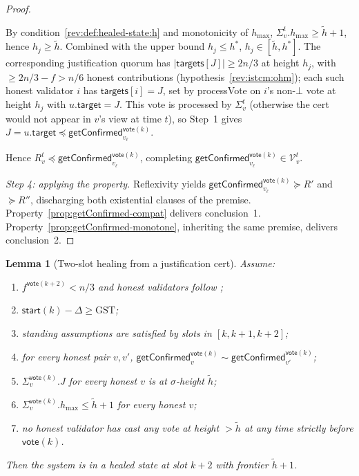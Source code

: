 \ifx\litemode\undefined\documentclass{article}\fi
\newcommand{\V}[0]{\ensuremath{\mathcal{V}}}
\newcommand{\target}{\mathsf{target}}
\newcommand{\targets}{\mathsf{targets}}
\newcommand{\hmax}{\ensuremath{h_{\max}}\xspace}
\newcommand{\processVote}{\textsf{processVote}\xspace}
\newcommand{\start}{\ensuremath{\mathsf{start}}}
\newcommand{\vote}{\ensuremath{\mathsf{vote}}}
\newcommand{\GST}{\ensuremath{\mathrm{GST}}\xspace}
\newcommand{\comm}[1]{\ensuremath{\widetilde{#1}}}
\newcommand{\getConfirmed}{\textsf{getConfirmed}\xspace}
\theoremstyle{plain}
\newtheorem{lemma}{Lemma}
\theoremstyle{definition}
\theoremstyle{remark}
\begin{document}
\begin{proof}
\begin{itemize}
  By condition~\ref{rev:def:healed-state:h} and monotonicity of $\hmax$, $\Sigma_v^t.\hmax \geq \comm{h}+1$, hence $h_j \geq \comm{h}$.
  Combined with the upper bound $h_j \leq h^\ast$, $h_j \in [\comm{h}, h^\ast]$.
  The corresponding justification quorum has $|\targets[J]| \geq 2n/3$ at height $h_j$, with $\geq 2n/3 - f > n/6$ honest contributions (hypothesis~\ref{rev:istcm:ohm}); each such honest validator $i$ has $\targets[i] = J$, set by \processVote on $i$'s non-$\bot$ vote at height $h_j$ with $u.\target = J$.
  This vote is processed by $\Sigma_v^t$ (otherwise the cert would not appear in $v$'s view at time $t$), so Step~1 gives $J = u.\target \preceq \getConfirmed_{v_\ell}^{\vote(k)}$.
\end{itemize}
Hence $R_v^t \preceq \getConfirmed_{v_\ell}^{\vote(k)}$, completing $\getConfirmed_{v_\ell}^{\vote(k)} \in \V_v^t$.

\emph{Step 4: applying the property.}
Reflexivity yields $\getConfirmed_{v_\ell}^{\vote(k)} \succeq R'$ and $\succeq R''$, discharging both existential clauses of the premise.
Property~\ref{prop:getConfirmed-compat} delivers conclusion~1.
Property~\ref{prop:getConfirmed-monotone}, inheriting the same premise, delivers conclusion~2.
\end{proof}
\fi


\begin{lemma}[Two-slot healing from a justification cert]\label{lem:healing-from-cert}
Assume:
\begin{enumerate}
  \item\label{rev:hfcert:f} $f^{\vote(k+2)} < n/3$ and honest validators follow ;
  \item\label{rev:hfcert:sync} $\start(k) - \Delta \geq \GST$;
  \item\label{rev:hfcert:standing} standing assumptions are satisfied by slots in $[k,k+1,k+2]$;
  \item\label{rev:hfcert:compat} for every honest pair $v, v'$, $\getConfirmed_v^{\vote(k)} \sim \getConfirmed_{v'}^{\vote(k)}$;
  \item\label{rev:hfcert:hj} $\Sigma_v^{\vote(k)}.J$ for every honest $v$ is at $\sigma$-height $\comm{h}$;
  \item\label{rev:hfcert:hmax} $\Sigma_v^{\vote(k)}.\hmax \leq \comm{h}+1$ for every honest $v$;
  \item\label{rev:hfcert:nh} no honest validator has cast any vote at height $> \comm{h}$ at any time strictly before $\vote(k)$.
\end{enumerate}
Then the system is in a healed state at slot $k+2$ with frontier $\comm{h}+1$.
\end{lemma}
\end{document}
